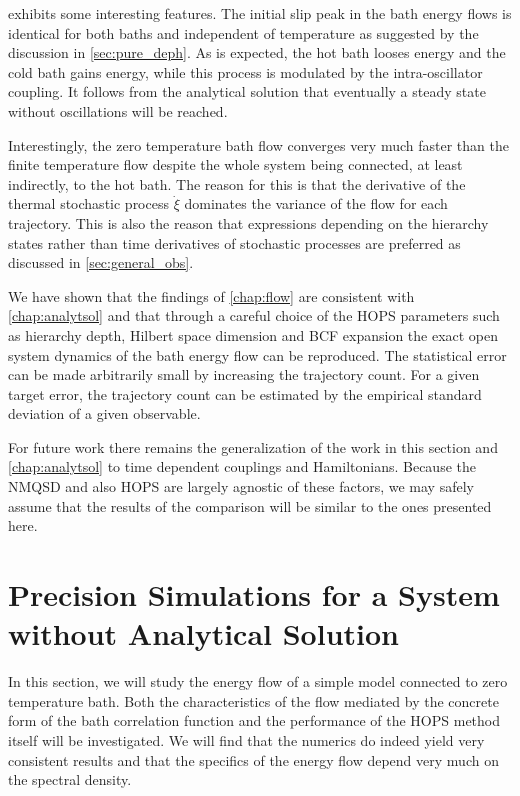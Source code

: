  exhibits some interesting features. The
initial slip peak in the bath energy flows is identical for both baths
and independent of temperature as suggested by the discussion in
\cref{sec:pure_deph}. As is expected, the hot bath looses energy and
the cold bath gains energy, while this process is modulated by the
intra-oscillator coupling. It follows from the analytical solution
that eventually a steady state without oscillations will be reached.

Interestingly, the zero temperature bath flow converges very much
faster than the finite temperature flow despite the whole system being
connected, at least indirectly, to the hot bath. The reason for this
is that the derivative of the thermal stochastic process \(\dot{ξ}\)
dominates the variance of the flow for each trajectory. This is also
the reason that expressions depending on the hierarchy states rather
than time derivatives of stochastic processes are preferred as
discussed in \cref{sec:general_obs}.

 We have shown that
the findings of \cref{chap:flow} are consistent with
\cref{chap:analytsol} and that through a careful choice of the HOPS
parameters such as hierarchy depth, Hilbert space dimension and BCF
expansion the exact open system dynamics of the bath energy flow can
be reproduced. The statistical error can be made arbitrarily small by
increasing the trajectory count. For a given target error, the
trajectory count can be estimated by the empirical standard deviation
of a given observable.

For future work there remains the generalization of the work in this
section and \cref{chap:analytsol} to time dependent couplings and
Hamiltonians. Because the NMQSD and also HOPS are largely agnostic of
these factors, we may safely assume that the results of the comparison
will be similar to the ones presented here.

\section{Precision Simulations for a System without Analytical
  Solution}
\label{sec:prec_sim}
In this section, we will study the energy flow of a simple model
connected to zero temperature bath. Both the characteristics of the
flow mediated by the concrete form of the bath correlation function
and the performance of the HOPS method itself will be investigated. We
will find that the numerics do indeed yield very consistent results
and that the specifics of the energy flow depend very much on the
spectral density.

